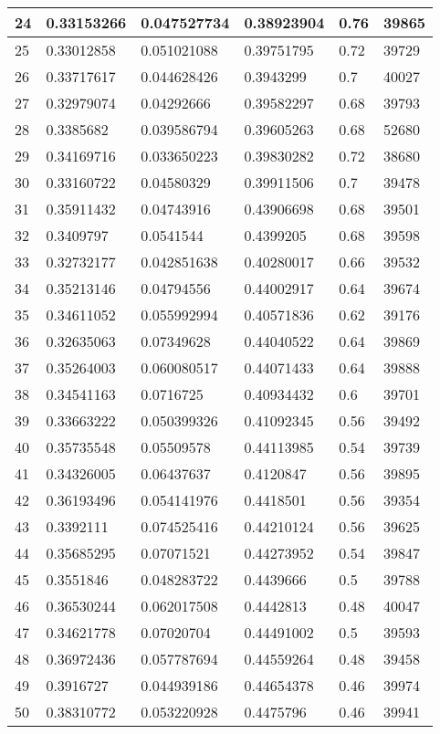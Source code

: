 \begin{longtable}{|l|l|l|l|l|l|}
24 & 0.33153266 & 0.047527734 & 0.38923904 & 0.76 & 39865 \\ \hline 
25 & 0.33012858 & 0.051021088 & 0.39751795 & 0.72 & 39729 \\ \hline 
26 & 0.33717617 & 0.044628426 & 0.3943299 & 0.7 & 40027 \\ \hline 
27 & 0.32979074 & 0.04292666 & 0.39582297 & 0.68 & 39793 \\ \hline 
28 & 0.3385682 & 0.039586794 & 0.39605263 & 0.68 & 52680 \\ \hline 
29 & 0.34169716 & 0.033650223 & 0.39830282 & 0.72 & 38680 \\ \hline 
30 & 0.33160722 & 0.04580329 & 0.39911506 & 0.7 & 39478 \\ \hline 
31 & 0.35911432 & 0.04743916 & 0.43906698 & 0.68 & 39501 \\ \hline 
32 & 0.3409797 & 0.0541544 & 0.4399205 & 0.68 & 39598 \\ \hline 
33 & 0.32732177 & 0.042851638 & 0.40280017 & 0.66 & 39532 \\ \hline 
34 & 0.35213146 & 0.04794556 & 0.44002917 & 0.64 & 39674 \\ \hline 
35 & 0.34611052 & 0.055992994 & 0.40571836 & 0.62 & 39176 \\ \hline 
36 & 0.32635063 & 0.07349628 & 0.44040522 & 0.64 & 39869 \\ \hline 
37 & 0.35264003 & 0.060080517 & 0.44071433 & 0.64 & 39888 \\ \hline 
38 & 0.34541163 & 0.0716725 & 0.40934432 & 0.6 & 39701 \\ \hline 
39 & 0.33663222 & 0.050399326 & 0.41092345 & 0.56 & 39492 \\ \hline 
40 & 0.35735548 & 0.05509578 & 0.44113985 & 0.54 & 39739 \\ \hline 
41 & 0.34326005 & 0.06437637 & 0.4120847 & 0.56 & 39895 \\ \hline 
42 & 0.36193496 & 0.054141976 & 0.4418501 & 0.56 & 39354 \\ \hline 
43 & 0.3392111 & 0.074525416 & 0.44210124 & 0.56 & 39625 \\ \hline 
44 & 0.35685295 & 0.07071521 & 0.44273952 & 0.54 & 39847 \\ \hline 
45 & 0.3551846 & 0.048283722 & 0.4439666 & 0.5 & 39788 \\ \hline 
46 & 0.36530244 & 0.062017508 & 0.4442813 & 0.48 & 40047 \\ \hline 
47 & 0.34621778 & 0.07020704 & 0.44491002 & 0.5 & 39593 \\ \hline 
48 & 0.36972436 & 0.057787694 & 0.44559264 & 0.48 & 39458 \\ \hline 
49 & 0.3916727 & 0.044939186 & 0.44654378 & 0.46 & 39974 \\ \hline 
50 & 0.38310772 & 0.053220928 & 0.4475796 & 0.46 & 39941 \\ \hline 
\end{longtable}